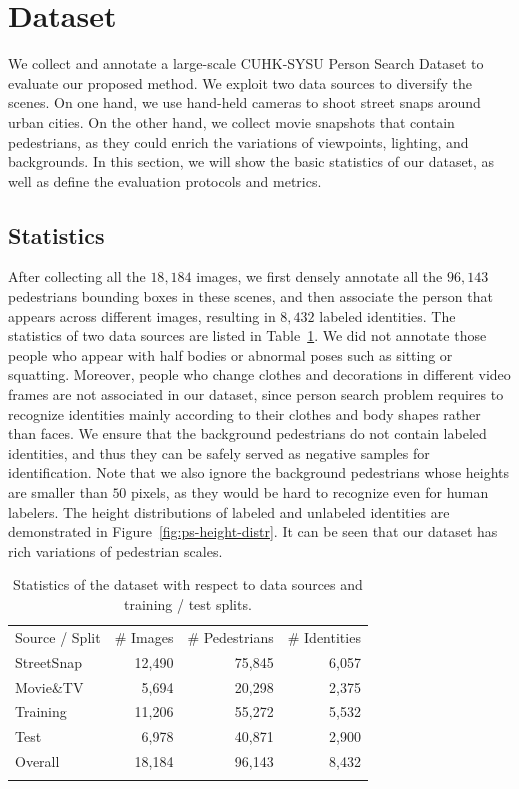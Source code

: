 \section{Dataset} %
\label{sec:ps-dataset}
We collect and annotate a large-scale CUHK-SYSU Person Search Dataset to evaluate our proposed method. We exploit two data sources to diversify the scenes. On one hand, we use hand-held cameras to shoot street snaps around urban cities. On the other hand, we collect movie snapshots that contain pedestrians, as they could enrich the variations of viewpoints, lighting, and backgrounds. In this section, we will show the basic statistics of our dataset, as well as define the evaluation protocols and metrics.

\subsection{Statistics} %
\label{sub:ps-statistics}
After collecting all the $18,184$ images, we first densely annotate all the $96,143$ pedestrians bounding boxes in these scenes, and then associate the person that appears across different images, resulting in $8,432$ labeled identities. The statistics of two data sources are listed in Table~\ref{tab:ps-dataset-stats}. We did not annotate those people who appear with half bodies or abnormal poses such as sitting or squatting. Moreover, people who change clothes and decorations in different video frames are not associated in our dataset, since person search problem requires to recognize identities mainly according to their clothes and body shapes rather than faces. We ensure that the background pedestrians do not contain labeled identities, and thus they can be safely served as negative samples for identification. Note that we also ignore the background pedestrians whose heights are smaller than $50$ pixels, as they would be hard to recognize even for human labelers. The height distributions of labeled and unlabeled identities are demonstrated in Figure~\ref{fig:ps-height-distr}. It can be seen that our dataset has rich variations of pedestrian scales.
\begin{table}
\begin{center}
\begin{tabular}{lrrr}
\hline\noalign{\smallskip}
\noalign{\smallskip}
Source / Split & \# Images & \# Pedestrians & \# Identities \\
\noalign{\smallskip}\hline\hline\noalign{\smallskip}
StreetSnap & 12,490 & 75,845 & 6,057 \\
Movie\&TV & 5,694 & 20,298 & 2,375 \\
\hline\noalign{\smallskip}
Training & 11,206 & 55,272 & 5,532 \\
Test & 6,978 & 40,871 & 2,900 \\
\hline\noalign{\smallskip}
Overall & 18,184 & 96,143 & 8,432 \\
\hline\noalign{\smallskip}
\end{tabular}
\end{center}
\caption{Statistics of the dataset with respect to data sources and training / test splits.}
\label{tab:ps-dataset-stats}
\end{table}


